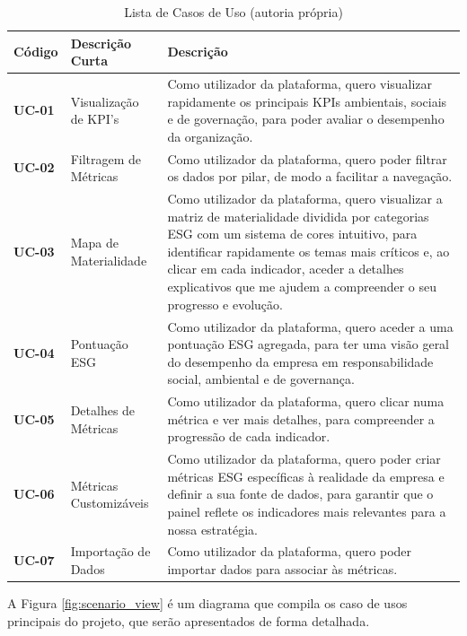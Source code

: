 \begin{table}[H]
    \centering
    \begin{tabular}{|>{\bfseries}p{1.5cm} |p{3.5cm} |p{8cm}|}
            \hline
        Código & \textbf{Descrição Curta} & \textbf{Descrição} \\
            \hline
        UC-01 & Visualização de KPI's & Como utilizador da plataforma, quero visualizar rapidamente os principais KPIs ambientais, sociais e de governação, para poder avaliar o desempenho da organização. \\
            \hline
        UC-02 & Filtragem de Métricas & Como utilizador da plataforma, quero poder filtrar os dados por pilar, de modo a facilitar a navegação. \\
            \hline
        UC-03 & Mapa de Materialidade & Como utilizador da plataforma, quero visualizar a matriz de materialidade dividida por categorias ESG com um sistema de cores intuitivo, para identificar rapidamente os temas mais críticos e, ao clicar em cada indicador, aceder a detalhes explicativos que me ajudem a compreender o seu progresso e evolução. \\
            \hline
        UC-04 & Pontuação ESG & Como utilizador da plataforma, quero aceder a uma pontuação ESG agregada, para ter uma visão geral do desempenho da empresa em responsabilidade social, ambiental e de governança. \\
            \hline
        UC-05 & Detalhes de Métricas & Como utilizador da plataforma, quero clicar numa métrica e ver mais detalhes, para compreender a progressão de cada indicador. \\
            \hline
        UC-06 & Métricas Customizáveis & Como utilizador da plataforma, quero poder criar métricas ESG específicas à realidade da empresa e definir a sua fonte de dados, para garantir que o painel reflete os indicadores mais relevantes para a nossa estratégia. \\
            \hline
        UC-07 & Importação de Dados & Como utilizador da plataforma, quero poder importar dados para associar às métricas. \\   
            \hline   
    \end{tabular}
    \caption{Lista de Casos de Uso (autoria própria)}
    \label{tab:use_cases}
\end{table}

A Figura \ref{fig:scenario_view} é um diagrama que compila os caso de usos principais do projeto, que serão apresentados de forma detalhada.

